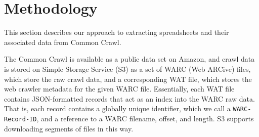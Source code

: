 \documentclass[conference]{IEEEtran}
\begin{document}


\section{Methodology}

This section describes our approach to extracting spreadsheets and their associated data from Common Crawl.


The Common Crawl is available as a public data set on Amazon, and crawl data is stored on Simple Storage Service (S3) as a set of WARC (Web ARCive) files, which store the raw crawl data, and a corresponding WAT file, which stores the web crawler metadata for the given WARC file. Essentially, each WAT file contains JSON-formatted records that act as an index into the WARC raw data. That is, each record contains a globally unique identifier, which we call a \texttt{WARC-Record-ID}, and a reference to a WARC filename, offset, and length. S3 supports downloading segments of files in this way.
\end{document}
